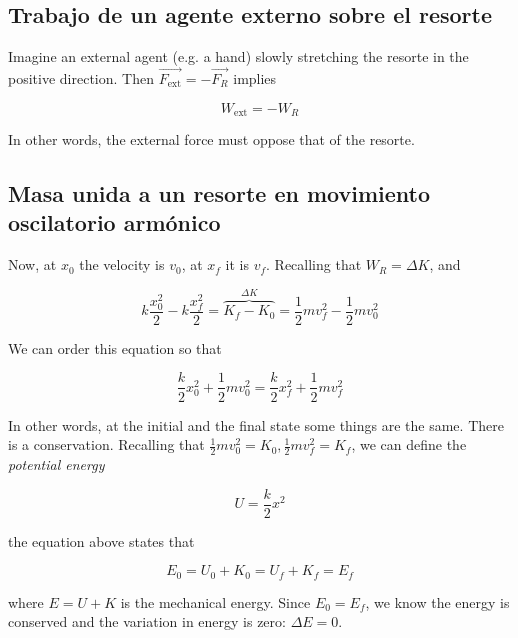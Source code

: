 \documentclass[12pt]{article}
\theoremstyle{definition}
\begin{document}
\subsection{Trabajo de un agente externo sobre el resorte}

Imagine an external agent (e.g. a hand) slowly stretching the resorte in the
positive direction. Then $\vec{F_{\text{ext}}} = - \vec{F_R}$ implies 

\begin{equation*}
    W_{\text{ext}} = - W_R
\end{equation*}

In other words, the external force must oppose that of the resorte. 

\subsection{Masa unida a un resorte en movimiento oscilatorio armónico}

Now, at $x_0$ the velocity is $v_0$, at $x_f$ it is $v_f$. Recalling that 
$W_R = \Delta K$, and 

\begin{equation*}
    k \frac{x_0^2}{2} - k \frac{x_f^2}{2} = \overbrace{K_f - K_0}^{\Delta K} = \frac{1}{2} m v_f^2 -
    \frac{1}{2}m v_0^2
\end{equation*}

We can order this equation so that 

\begin{equation*}
    \frac{k}{2} x_0^2 + \frac{1}{2}m v_0^2 = \frac{k}{2}x_f^2 + \frac{1}{2}m
    v_f^2
\end{equation*}

In other words, at the initial and the final state some things are the same.
There is a conservation. Recalling that $\frac{1}{2}m v_0^2 = K_0,
\frac{1}{2}mv^2_f = K_f$, we can define the \textit{potential energy}

\begin{equation*}
    U = \frac{k}{2}x^2
\end{equation*}

the equation above states that 

\begin{equation}
    E_0 = U_0 + K_0 = U_f + K_f = E_f
\end{equation}

where $E = U+ K$ is the mechanical energy. Since $E_0 = E_f$, we know the energy
is conserved and the variation in energy is zero: $\Delta E = 0$.
\end{document}
